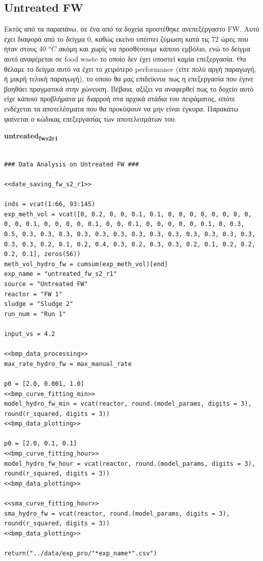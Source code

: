 \documentclass[11pt]{article}
\begin{document}
\subsection{Untreated FW}
\label{sec:orgc06ced0}
Εκτός από τα παραπάνω, σε ένα από τα δοχεία προστέθηκε ανεπεξέργαστο FW. Αυτό έχει διαφορά από το δείγμα 0, καθώς εκείνο υπέστει ζύμωση κατά τις 72 ώρες που ήταν στους 40 \(^oC\) ακόμη και χωρίς να προσθέσουμε κάποιο εμβόλιο, ενώ το δείγμα αυτό αναφέρεται σε food waste το οποίο δεν έχει υποστεί καμία επεξεργασία. Θα θέλαμε το δείγμα αυτό να έχει το χειρότερο performance (είτε πολύ αργή παραγωγή, ή μικρή τελική παραγωγή), το οποίο θα μας επιδείκνυε πως η επεξεργασία που έγινε βοηθάει πραγματικά στην χώνευση. Βέβαια, αξίζει να αναφερθεί πως το δοχείο αυτό είχε κάποιο προβλήματα με διαρροή στα αρχικά στάδια του πειράματος, οπότε ενδέχεται τα αποτελέσματα που θα προκύψουν να μην είναι έγκυρα. Παρακάτω φαίνεται ο κώδικας επεξεργασίας των αποτελεσμάτων του.

\textbf{untreated\textsubscript{fw}\textsubscript{s2}\textsubscript{r1}}
\begin{verbatim}

### Data Analysis on Untreated FW ###

<<date_saving_fw_s2_r1>>

inds = vcat(1:66, 93:145)
exp_meth_vol = vcat([0, 0.2, 0, 0, 0.1, 0.1, 0, 0, 0, 0, 0, 0, 0, 0, 0, 0, 0.1, 0, 0, 0, 0, 0.1, 0, 0, 0.1, 0, 0, 0, 0, 0, 0.1, 0, 0.3, 0.5, 0.3, 0.3, 0.3, 0.3, 0.3, 0.3, 0.3, 0.3, 0.3, 0.3, 0.3, 0.3, 0.3, 0.3, 0.3, 0.2, 0.1, 0.2, 0.4, 0.3, 0.2, 0.3, 0.3, 0.2, 0.1, 0.2, 0.2, 0.2, 0.1], zeros(56))
meth_vol_hydro_fw = cumsum(exp_meth_vol)[end]
exp_name = "untreated_fw_s2_r1"
source = "Untreated FW"
reactor = "FW 1"
sludge = "Sludge 2"
run_num = "Run 1"

input_vs = 4.2

<<bmp_data_processing>>
max_rate_hydro_fw = max_manual_rate

p0 = [2.0, 0.001, 1.0]
<<bmp_curve_fitting_min>>
model_hydro_fw_min = vcat(reactor, round.(model_params, digits = 3), round(r_squared, digits = 3))
<<bmp_data_plotting>>

p0 = [2.0, 0.1, 0.1]
<<bmp_curve_fitting_hour>>
model_hydro_fw_hour = vcat(reactor, round.(model_params, digits = 3), round(r_squared, digits = 3))
<<bmp_data_plotting>>

<<sma_curve_fitting_hour>>
sma_hydro_fw = vcat(reactor, round.(model_params, digits = 3), round(r_squared, digits = 3))
<<bmp_data_plotting>>

return("../data/exp_pro/"*exp_name*".csv")
\end{verbatim}
\end{document}
